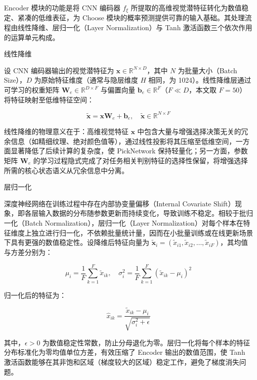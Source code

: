 
Encoder 模块的功能是将 CNN 编码器 $f_\xi$ 所提取的高维视觉潜特征转化为数值稳定、紧凑的低维表征，为 Choose 模块的概率预测提供可靠的输入基础。其处理流程由线性降维、层归一化（Layer Normalization）与 Tanh 激活函数三个依次作用的运算单元构成。

线性降维

设 CNN 编码器输出的视觉潜特征为 $\mathbf{x} \in \mathbb{R}^{N \times D}$，其中 $N$ 为批量大小（Batch Size），$D$ 为原始特征维度（通常与隐层维度 $H$ 相同，为 1024）。线性降维层通过可学习的权重矩阵 $\mathbf{W}_e \in \mathbb{R}^{D \times F}$ 与偏置向量 $\mathbf{b}_e \in \mathbb{R}^F$（$F \ll D$，本文取 $F = 50$）将特征映射至低维特征空间：

\begin{equation}
    \tilde{\mathbf{x}} = \mathbf{x} \mathbf{W}_e + \mathbf{b}_e, \quad \tilde{\mathbf{x}} \in \mathbb{R}^{N \times F}
\end{equation}

线性降维的物理意义在于：高维视觉特征 $\mathbf{x}$ 中包含大量与增强选择决策无关的冗余信息（如精细纹理、绝对颜色值等），通过线性投影将其压缩至低维空间，一方面显著降低了后续计算的复杂度，使 PickNetwork 保持轻量化；另一方面，参数矩阵 $\mathbf{W}_e$ 的学习过程隐式完成了对任务相关判别特征的选择性保留，将增强选择所需的核心状态语义从冗余信息中分离。

层归一化

深度神经网络在训练过程中存在内部协变量偏移（Internal Covariate Shift）现象，即各层输入数据的分布随参数更新而持续变化，导致训练不稳定。相较于批归一化（Batch Normalization），层归一化（Layer Normalization）对每个样本在特征维度上独立进行归一化，不依赖批量统计量，因而在小批量训练或在线更新场景下具有更强的数值稳定性。设降维后特征向量为 $\tilde{\mathbf{x}}_i = (\tilde{x}_{i1}, \tilde{x}_{i2}, \ldots, \tilde{x}_{iF})$，其均值与方差分别为：

\begin{equation}
    \mu_i = \frac{1}{F} \sum_{k=1}^{F} \tilde{x}_{ik}, \quad \sigma_i^2 = \frac{1}{F} \sum_{k=1}^{F} \left( \tilde{x}_{ik} - \mu_i \right)^2
\end{equation}

归一化后的特征为：

\begin{equation}
    \hat{x}_{ik} = \frac{\tilde{x}_{ik} - \mu_i}{\sqrt{\sigma_i^2 + \epsilon}}
\end{equation}

其中，$\epsilon > 0$ 为数值稳定性常数，防止分母退化为零。层归一化将每个样本的特征分布标准化为零均值单位方差，有效压缩了 Encoder 输出的数值范围，使 Tanh 激活函数能够在其非饱和区域（梯度较大的区域）稳定工作，避免了梯度消失问题。

